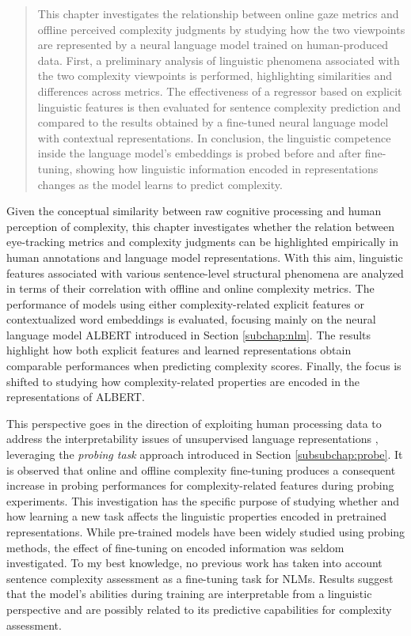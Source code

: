 \documentclass[a4paper, nobind]{templates/ociamthesis}
\begin{document}
\minitoc 


\begin{quote}
This chapter investigates the relationship between online gaze metrics and offline perceived complexity judgments by studying how the two viewpoints are represented by a neural language model trained on human-produced data. First, a preliminary analysis of linguistic phenomena associated with the two complexity viewpoints is performed, highlighting similarities and differences across metrics. The effectiveness of a regressor based on explicit linguistic features is then evaluated for sentence complexity prediction and compared to the results obtained by a fine-tuned neural language model with contextual representations. In conclusion, the linguistic competence inside the language model's embeddings is probed before and after fine-tuning, showing how linguistic information encoded in representations changes as the model learns to predict complexity.
\end{quote}

Given the conceptual similarity between raw cognitive processing and human perception of complexity, this chapter investigates whether the relation between eye-tracking metrics and complexity judgments can be highlighted empirically in human annotations and language model representations. With this aim, linguistic features associated with various sentence-level structural phenomena are analyzed in terms of their correlation with offline and online complexity metrics. The performance of models using either complexity-related explicit features or contextualized word embeddings is evaluated, focusing mainly on the neural language model ALBERT \autocite{lan-etal-2020-albert} introduced in Section \ref{subchap:nlm}. The results highlight how both explicit features and learned representations obtain comparable performances when predicting complexity scores. Finally, the focus is shifted to studying how complexity-related properties are encoded in the representations of ALBERT.

This perspective goes in the direction of exploiting human processing data to address the interpretability issues of unsupervised language representations \autocites{hollenstein-etal-2019-cognival}{gauthier-levy-2019-linking}{abnar-etal-2019-blackbox}, leveraging the \emph{probing task} approach introduced in Section \ref{subsubchap:probe}. It is observed that online and offline complexity fine-tuning produces a consequent increase in probing performances for complexity-related features during probing experiments. This investigation has the specific purpose of studying whether and how learning a new task affects the linguistic properties encoded in pretrained representations. While pre-trained models have been widely studied using probing methods, the effect of fine-tuning on encoded information was seldom investigated. To my best knowledge, no previous work has taken into account sentence complexity assessment as a fine-tuning task for NLMs. Results suggest that the model's abilities during training are interpretable from a linguistic perspective and are possibly related to its predictive capabilities for complexity assessment.
\end{document}
